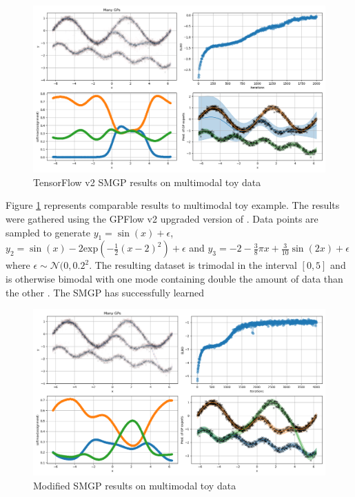 \documentclass[12pt,a4paper]{report}
\theoremstyle{definition}
\begin{document}
\begin{figure}[H]
    \centering
    \includegraphics[width=\linewidth]{demo_tf2.png}
    \caption{TensorFlow v2 SMGP results on multimodal toy data}
    \label{fig:MultimodalSMGP}
\end{figure}

Figure \ref{fig:MultimodalSMGP} represents comparable results to \citet{Kaiser2018} multimodal toy example.
The results were gathered using the GPFlow v2 upgraded version of \citet{Lui2020}.
Data points are sampled to generate $y_{1} = \sin (x) + \epsilon$, $y_{2} = \sin(x) - 2 \textrm{exp}(-\frac{1}{2}(x - 2)^2) + \epsilon$ and $y_{3} = -2 -\frac{3}{8}\pi x + \frac{3}{10} \sin(2x) + \epsilon$ where $\epsilon \sim \mathcal{N}(0, 0.2^2$. 
The resulting dataset is trimodal in the interval $[0, 5]$ and is otherwise bimodal with one mode containing double the amount of data than the other \citep{Kaiser2018}.
The SMGP has successfully learned 

\begin{figure}[H]
    \centering
    \includegraphics[width=\linewidth]{demo_tf2_modified.png}
    \caption{Modified SMGP results on multimodal toy data}
    \label{fig:MultimodalSMGPModified}
\end{figure}
\end{document}
